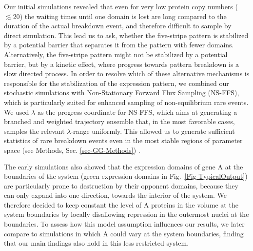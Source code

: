 \documentclass[a4paper,10pt]{article}
\newcommand{\Drosophila}{{\it Drosophila}\xspace}
\newcommand{\hb}{{\it hb}\xspace}
\newcommand{\Hb}{{\it Hb}\xspace}
\newcommand{\Bcd}{{\it Bcd}\xspace}
\newcommand{\Tll}{{\it Tll}\xspace}
\newcommand{\GA}{A\xspace}
\begin{document}
Our initial simulations revealed that even for very low protein copy numbers ($\lesssim 20$) the waiting times until one domain is lost are long compared to the duration of the actual breakdown event, and therefore difficult to sample by direct simulation. This lead us to ask, whether the five-stripe pattern is stabilized by a potential barrier that separates it from the pattern with fewer domains. Alternatively, the five-stripe pattern might not be stabilized by a potential barrier, but by a kinetic effect, where progress towards pattern breakdown is a slow directed process.
In order to resolve which of these alternative mechanisms is responsible for the stabilization of the expression pattern, we combined our stochastic simulations with Non-Stationary Forward Flux Sampling (NS-FFS), which is particularly suited for enhanced sampling of non-equilibrium rare events. %
We used $\lambda$ as the progress coordinate for NS-FFS, which aims at generating a branched and weighted trajectory ensemble that, in the most favorable cases, samples the relevant $\lambda$-range uniformly. This allowed us to generate sufficient statistics of rare breakdown events even in the most stable regions of parameter space (see Methods, Sec. \ref{sec-GG-Methods}) .

The early simulations also showed that the expression domains of gene \GA at the boundaries of the system (green expression domains in Fig.~\ref{Fig-TypicalOutput}) are particularly prone to destruction by their opponent domains, because they can only expand into one direction, towards the interior of the system.
We therefore decided to keep constant the level of \GA proteins in the volume at the system boundaries by locally disallowing repression in the outermost nuclei at the boundaries.
To assess how this model assumption influences our results, we later compare to simulations in which \GA could vary at the system boundaries, finding that our main findings also hold in this less restricted system.
\end{document}

